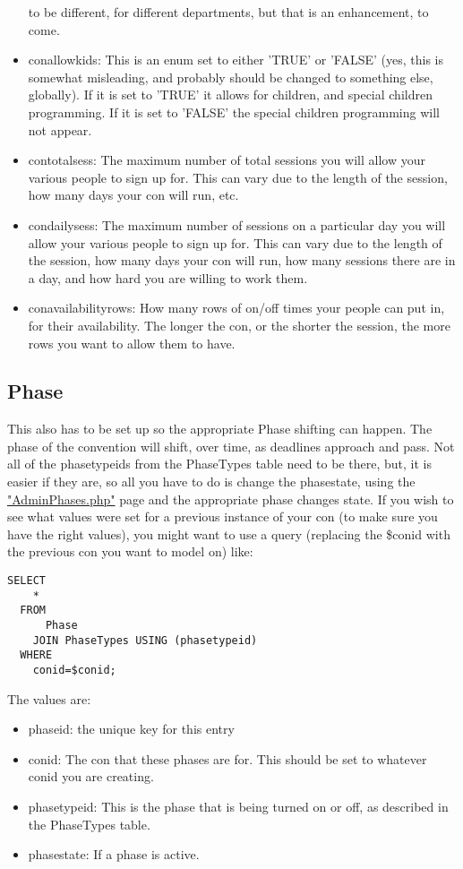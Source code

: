 \documentclass[captions=tablesignature]{scrartcl}
\begin{document}
\begin{itemize}
to be different, for different departments, but that is an
enhancement, to come.
\item conallowkids: This is an enum set to either 'TRUE' or 'FALSE'
(yes, this is somewhat misleading, and probably should be changed
to something else, globally).  If it is set to 'TRUE' it allows
for children, and special children programming.  If it is set to
'FALSE' the special children programming will not appear.
\item contotalsess: The maximum number of total sessions you will allow
your various people to sign up for.  This can vary due to the
length of the session, how many days your con will run, etc.
\item condailysess: The maximum number of sessions on a particular day
you will allow your various people to sign up for.  This can vary
due to the length of the session, how many days your con will
run, how many sessions there are in a day, and how hard you are
willing to work them.
\item conavailabilityrows: How many rows of on/off times your people
can put in, for their availability.  The longer the con, or the
shorter the session, the more rows you want to allow them to
have.
\end{itemize}

\subsection{Phase}
\label{sec-11-2}
This also has to be set up so the appropriate Phase shifting can
happen.  The phase of the convention will shift, over time, as
deadlines approach and pass.  Not all of the phasetypeids from the
PhaseTypes table need to be there, but, it is easier if they are,
so all you have to do is change the phasestate, using the
\href{../webpages/AdminPhases.php}{"AdminPhases.php"} page and the appropriate phase changes state.  If
you wish to see what values were set for a previous instance of
your con (to make sure you have the right values), you might want
to use a query (replacing the \$conid with the previous con you want
to model on) like:
\begin{verbatim}
SELECT
    *
  FROM
      Phase
    JOIN PhaseTypes USING (phasetypeid)
  WHERE
    conid=$conid;
\end{verbatim}
The values are:
\begin{itemize}
\item phaseid: the unique key for this entry
\item conid: The con that these phases are for.  This should be set to
whatever conid you are creating.
\item phasetypeid: This is the phase that is being turned on or off, as
described in the PhaseTypes table.
\item phasestate: If a phase is active.
\end{itemize}
\end{document}
